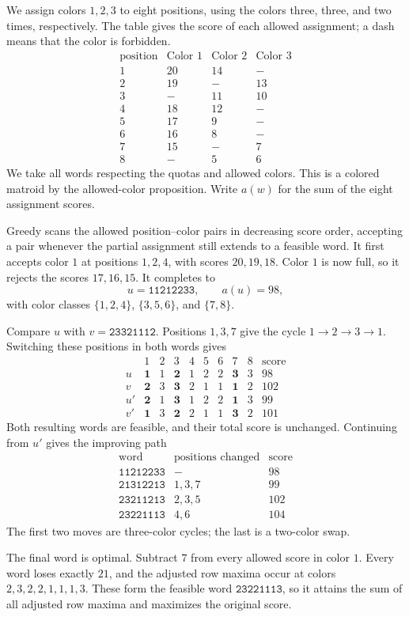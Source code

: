 \begin{example}
We assign colors $1,2,3$ to eight positions, using the colors three, three,
and two times, respectively. The table gives the score of each allowed
assignment; a dash means that the color is forbidden.
\[
\begin{array}{c|rrr}
 \text{position}&\text{Color }1&\text{Color }2&\text{Color }3\\ \hline
 1&20&14&-\\
 2&19&-&13\\
 3&-&11&10\\
 4&18&12&-\\
 5&17&9&-\\
 6&16&8&-\\
 7&15&-&7\\
 8&-&5&6
\end{array}
\]
We take all words respecting the quotas and allowed colors. This is a
colored matroid by the allowed-color proposition. Write $a(w)$ for the sum
of the eight assignment scores.

Greedy scans the allowed position--color pairs in decreasing score order,
accepting a pair whenever the partial assignment still extends to a feasible
word. It first accepts color $1$ at positions $1,2,4$, with scores $20,19,18$.
Color $1$ is now full, so it rejects the scores $17,16,15$. It completes to
\[
 u=\mathtt{11212233},\qquad a(u)=98,
\]
with color classes $\{1,2,4\}$, $\{3,5,6\}$, and $\{7,8\}$.

Compare $u$ with $v=\mathtt{23321112}$. Positions $1,3,7$ give the cycle
$1\to2\to3\to1$. Switching these positions in both words gives
\[
\begin{array}{c|cccccccc|r}
 &1&2&3&4&5&6&7&8&\text{score}\\ \hline
 u&\mathbf1&1&\mathbf2&1&2&2&\mathbf3&3&98\\
 v&\mathbf2&3&\mathbf3&2&1&1&\mathbf1&2&102\\ \hline
 u'&\mathbf2&1&\mathbf3&1&2&2&\mathbf1&3&99\\
 v'&\mathbf1&3&\mathbf2&2&1&1&\mathbf3&2&101
\end{array}
\]
Both resulting words are feasible, and their total score is unchanged.
Continuing from $u'$ gives the improving path
\[
\begin{array}{c|c|r}
 \text{word}&\text{positions changed}&\text{score}\\ \hline
 \mathtt{11212233}&-&98\\
 \mathtt{21312213}&1,3,7&99\\
 \mathtt{23211213}&2,3,5&102\\
 \mathtt{23221113}&4,6&104
\end{array}
\]
The first two moves are three-color cycles; the last is a two-color swap.

The final word is optimal. Subtract $7$ from every allowed score in color
$1$. Every word loses exactly $21$, and the adjusted row maxima occur at
colors $2,3,2,2,1,1,1,3$. These form the feasible word
$\mathtt{23221113}$, so it attains the sum of all adjusted row maxima and
maximizes the original score.
\end{example}
